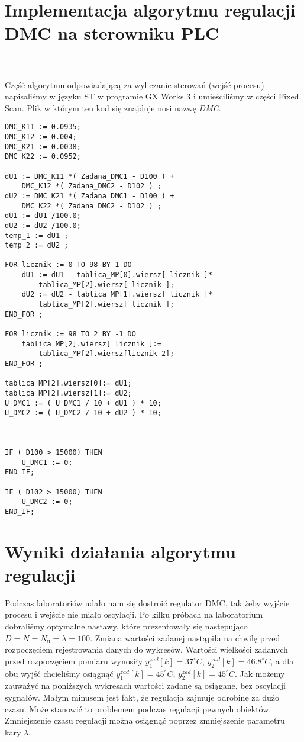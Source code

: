 \section{Implementacja algorytmu regulacji DMC na sterowniku PLC}
\label{thermal_dmc_impl}
~\\\\Część algorytmu odpowiadającą za wyliczanie sterowań (wejść procesu) napisaliśmy w języku ST w programie GX Works 3 i umieściliśmy w części Fixed Scan. Plik w którym ten kod się znajduje nosi nazwę \textit{DMC}.
\begin{lstlisting}[caption={Kod obliczający sterownanie dla regulatora dwuwymiarowego DMC (GX Works)}]
DMC_K11 := 0.0935;
DMC_K12 := 0.004;
DMC_K21 := 0.0038;
DMC_K22 := 0.0952;

dU1 := DMC_K11 *( Zadana_DMC1 - D100 ) + 
    DMC_K12 *( Zadana_DMC2 - D102 ) ;
dU2 := DMC_K21 *( Zadana_DMC1 - D100 ) + 
    DMC_K22 *( Zadana_DMC2 - D102 ) ;
dU1 := dU1 /100.0;
dU2 := dU2 /100.0;
temp_1 := dU1 ;
temp_2 := dU2 ;

FOR licznik := 0 TO 98 BY 1 DO
    dU1 := dU1 - tablica_MP[0].wiersz[ licznik ]* 
        tablica_MP[2].wiersz[ licznik ];
    dU2 := dU2 - tablica_MP[1].wiersz[ licznik ]* 
        tablica_MP[2].wiersz[ licznik ];
END_FOR ;

FOR licznik := 98 TO 2 BY -1 DO
    tablica_MP[2].wiersz[ licznik ]:= 
        tablica_MP[2].wiersz[licznik-2];
END_FOR ;

tablica_MP[2].wiersz[0]:= dU1;
tablica_MP[2].wiersz[1]:= dU2;
U_DMC1 := ( U_DMC1 / 10 + dU1 ) * 10; 
U_DMC2 := ( U_DMC2 / 10 + dU2 ) * 10; 



IF ( D100 > 15000) THEN
	U_DMC1 := 0;
END_IF;

IF ( D102 > 15000) THEN
	U_DMC2 := 0;
END_IF;
\end{lstlisting}

\section{Wyniki działania algorytmu regulacji}
\label{thermal_dmc_wyniki}
Podczas laboratoriów udało nam się dostroić regulator DMC, tak żeby wyjście procesu i wejście 
nie miało oscylacji. 
Po kilku próbach na laboratorium dobraliśmy optymalne nastawy, 
które prezentowały się następująco $D=N=N_{\mathrm{u}}=\lambda=100$. 
Zmiana wartości zadanej nastąpiła na chwilę przed rozpoczęciem rejestrowania danych do wykresów. 
Wartości wielkości zadanych przed rozpoczęciem pomiaru wynosiły $y_{\mathrm{1}}^{zad}[k] = 37^{\circ} C$, 
$y_{\mathrm{2}}^{zad}[k] = \num{46.8}^{\circ} C$, a dla obu wyjść chcieliśmy osiągnąć 
$y_{\mathrm{1}}^{zad}[k] = 45^{\circ} C$, $y_{\mathrm{2}}^{zad}[k] = 45^{\circ} C$. 
Jak możemy zauważyć na poniższych wykresach wartości zadane są osiągane, 
bez oscylacji sygnałów. Małym minusem jest fakt, że regulacja zajmuje odrobinę za dużo czasu. 
Może stanowić to problemem podczas regulacji pewnych obiektów. Zmniejszenie czasu regulacji można osiągnąć
poprzez zmniejszenie parametru kary $\lambda$.
 
